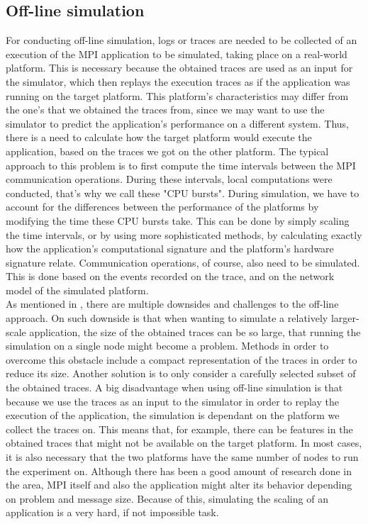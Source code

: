 \subsection{Off-line simulation}
For conducting off-line simulation, logs or traces are needed to be
collected of an execution of the MPI application to be simulated,
taking place on a
real-world platform. This is necessary because the obtained traces are
used as an input for the simulator, which then replays the execution
traces as if the application was running on the target platform. This
platform's characteristics may differ from the one's that we obtained
the traces from, since we may want to use the simulator to predict the
application's performance on a different system. Thus, there is a need
to calculate how the target platform would execute the application,
based on the traces we got on the other platform. The typical approach
to this problem is to first compute the time intervals between the MPI
communication operations. During these intervals, local computations
were conducted, that's why we call these "CPU bursts". During
simulation, we have to account for the differences between the
performance of the platforms by modifying the time these CPU bursts
take. This can be done by simply scaling the time intervals, or by
using more sophisticated methods, by calculating exactly how the
application's computational signature and the platform's hardware
signature relate.\cite{csgscq11} Communication operations, of course,
also need to be simulated. This is done based on the events recorded
on the trace, and on the network model of the simulated
platform.\cite{csgscq11}\\
As mentioned in \cite{csgscq11}, there are multiple downsides and
challenges to the off-line approach. On such downside is that when
wanting to simulate a relatively larger-scale application, the size of
the obtained traces can be so large, that running the simulation on a
single node might become a problem. Methods in order to overcome this
obstacle include a compact representation of the traces in order to
reduce its size. Another solution is to only consider a carefully
selected subset of the obtained traces. A big disadvantage when using
off-line simulation is that because we use the traces as an input to
the simulator in order to replay the execution of the application, the
simulation is dependant on the platform we collect the traces
on. This means that, for example, there can be features in the
obtained traces that might not be available on the target platform. In
most cases, it is also necessary that the two platforms have the same
number of nodes to run the experiment on. Although there has been a
good amount of research done in the area, MPI itself and also the
application might alter its behavior depending on problem and message
size. Because of this, simulating the scaling of an application is a
very hard, if not impossible task.\cite{bdglmqssv13}

